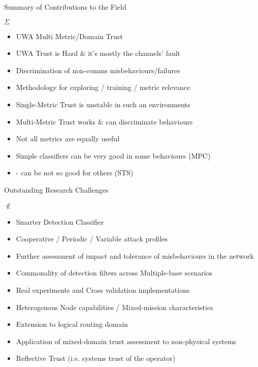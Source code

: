 \documentclass[aspectratio=43]{beamer}
\begin{document}
\begin{frame}{Summary of Contributions to the Field}
	\begin{block}{$\Sigma$}
		\begin{itemize}
			\item UWA Multi Metric/Domain Trust
			\item UWA Trust is \alert{Hard} \& it's mostly the channels' fault
			\item Discrimination of non-comms misbehaviours/failures 
			\item Methodology for exploring / training / metric relevance
			\item Single-Metric Trust is \alert{unstable} in such an environments
			\item Multi-Metric Trust works \& can \alert{discriminate behaviours}
			\item \alert{Not all metrics} are equally useful
			\item Simple classifiers \alert{can} be very good in \alert{some} behaviours (MPC)
			\item - can be \alert{not so good} for others (STS)
		\end{itemize}
	\end{block}
\end{frame}

\begin{frame}{Outstanding Research Challenges}
  \begin{alertblock}{$\notin$}
    \begin{itemize}
      \item Smarter Detection Classifier
      \item Cooperative / Periodic / Variable attack profiles
      \item Further assessment of impact and tolerance of misbehaviours in the network
      \item Commonality of detection filters across Multiple-base scenarios
      \item \alert{Real} experiments and Cross validation implementations
      \item Heterogenous Node capabilities / Mixed-mission characteristics
      \item Extension to logical routing domain
      \item Application of mixed-domain trust assessment to non-physical systems
      \item Reflective Trust (i.e. systems trust of the operator)

    \end{itemize}
  \end{alertblock}
\end{frame}
\end{document}
